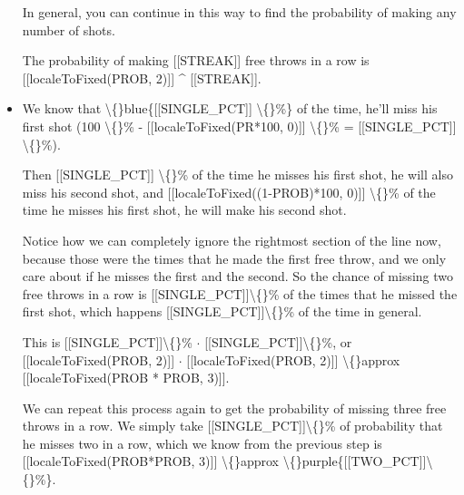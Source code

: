 \documentclass{article}
\begin{document}
\begin{itemize}
                
                    In general, you can continue in this way to find the probability of making any number of shots.
                
                
                    The probability of making [[STREAK]] free throws in a row is [[localeToFixed(PROB, 2)]] \textasciicircum{} [[STREAK]].
  \item We know that \textbackslash\{\}blue\{[[SINGLE\_PCT]] \textbackslash\{\}\%\} of the time, he'll miss
                    his first shot
                    (100 \textbackslash\{\}\% - [[localeToFixed(PR*100, 0)]] \textbackslash\{\}\% = [[SINGLE\_PCT]] \textbackslash\{\}\%).
                    
                    
                        Then [[SINGLE\_PCT]] \textbackslash\{\}\% of
                        the time he misses his first shot, he will also miss his second shot, and
                        [[localeToFixed((1-PROB)*100, 0)]] \textbackslash\{\}\% of the time he misses his
                        first shot, he will make his second shot.
                    
                    
                
                
                    Notice how we can completely ignore the rightmost section of the line now, because those were the times that
                    he made the first free throw, and we only care about if he misses the first and the second.
                    So the chance of missing two free throws in a row is [[SINGLE\_PCT]]\textbackslash\{\}\% of the times
                    that he missed the first shot, which happens [[SINGLE\_PCT]]\textbackslash\{\}\% of the time in general.
                
                
                    This is [[SINGLE\_PCT]]\textbackslash\{\}\% $\cdot$ [[SINGLE\_PCT]]\textbackslash\{\}\%, or
                    [[localeToFixed(PROB, 2)]] $\cdot$ [[localeToFixed(PROB, 2)]] \textbackslash\{\}approx
                    [[localeToFixed(PROB * PROB, 3)]].
                
                
                    
                        We can repeat this process again to get the probability of missing three free throws in a row. We simply take
                        [[SINGLE\_PCT]]\textbackslash\{\}\% of probability that he misses two in a row, which we know from the previous step is
                        [[localeToFixed(PROB*PROB, 3)]] \textbackslash\{\}approx \textbackslash\{\}purple\{[[TWO\_PCT]]\textbackslash\{\}\%\}.
                    

\end{itemize}
\end{document}
